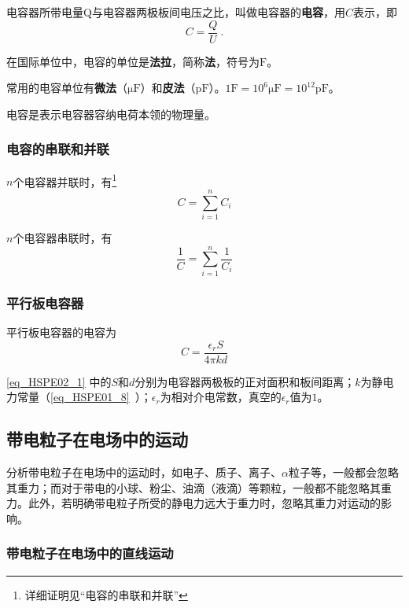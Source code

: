 电容器所带电量Q与电容器两极板间电压之比，叫做电容器的\textbf{电容}，用$C$表示，即
\begin{equation}
C=\frac{Q}{U}~.
\end{equation}

在国际单位中，电容的单位是\textbf{法拉}，简称\textbf{法}，符号为$\mathrm{F}$。

常用的电容单位有\textbf{微法}（$\mathrm{\mu F}$）和\textbf{皮法}（$\mathrm{pF}$）。$1\mathrm{F}=10^6 \mathrm{\mu F}=10^{12} \mathrm{pF}$。

电容是表示电容器容纳电荷本领的物理量。

\subsubsection{电容的串联和并联}
$n$个电容器并联时，有\footnote{详细证明见“电容的串联和并联”}
\begin{equation}
C=\sum_{i=1}^{n}C_i
\end{equation}

$n$个电容器串联时，有
\begin{equation}
\frac{1}{C}=\sum_{i=1}^{n}\frac{1}{C_i}
\end{equation}

\subsubsection{平行板电容器}

平行板电容器的电容为
\begin{equation}\label{eq_HSPE02_1}
C = \frac {\epsilon_r S}{4\pi kd}
\end{equation}

\autoref{eq_HSPE02_1} 中的$S$和$d$分别为电容器两极板的正对面积和板间距离；$k$为静电力常量（\autoref{eq_HSPE01_8}~）；$\epsilon_r$为相对介电常数，真空的$\epsilon_r$值为$1$。

\subsection{带电粒子在电场中的运动}

分析带电粒子在电场中的运动时，如电子、质子、离子、$\alpha$粒子等，一般都会忽略其重力；而对于带电的小球、粉尘、油滴（液滴）等颗粒，一般都不能忽略其重力。此外，若明确带电粒子所受的静电力远大于重力时，忽略其重力对运动的影响。

\subsubsection{带电粒子在电场中的直线运动}

